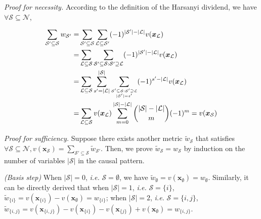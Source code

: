 \textit{Proof for necessity.}
According to the definition of the Harsanyi dividend, we have {\small$\forall \mathcal{S}\subseteq \mathcal{N}$}, 

\begin{small}
\begin{align*}
\sum_{\mathcal{S}'\subseteq \mathcal{S}}  w_{\mathcal{S}'}  =& \sum_{\mathcal{S}'\subseteq \mathcal{S}} \sum_{\mathcal{L}\subseteq \mathcal{S}'} (-1)^{|\mathcal{S}'|-|\mathcal{L}|}  v(\boldsymbol{x}_{\mathcal{L}}) \\
=& \sum_{\mathcal{L}\subseteq \mathcal{S}} \sum_{\mathcal{S}'\subseteq \mathcal{S}: \mathcal{S}'\supseteq \mathcal{L}} (-1)^{|\mathcal{S}'|-|\mathcal{L}|} v(\boldsymbol{x}_{\mathcal{L}}) \\
=& \sum_{\mathcal{L}\subseteq \mathcal{S}} \sum_{s'=|\mathcal{L}|}^{|\mathcal{S}|} \sum_{\scriptsize\substack{\mathcal{S}'\subseteq \mathcal{S}: \mathcal{S}'\supseteq \mathcal{L}\\
|\mathcal{S}'|=s'}} (-1)^{s'-|\mathcal{L}|} v(\boldsymbol{x}_{\mathcal{L}}) \\
=& \sum_{\mathcal{L}\subseteq \mathcal{S}} v(\boldsymbol{x}_{\mathcal{L}})  \sum_{m=0}^{|\mathcal{S}|-|\mathcal{L}|} \binom{|\mathcal{S}|-|\mathcal{L}|}{m} (-1)^{m}= v(\boldsymbol{x}_{\mathcal{S}}) 
\end{align*}
\end{small}



\textit{Proof for sufficiency.}
Suppose there exists another metric {\small$\tilde{w}_{\mathcal{S}}$} that satisfies {\small$\forall \mathcal{S}\subseteq \mathcal{N}, v(\boldsymbol{x}_{\mathcal{S}})  = {\sum}_{\mathcal{S}'\subseteq \mathcal{S}} \tilde{w}_{\mathcal{S}'} $}.
Then, we prove {\small$\tilde{w}_{\mathcal{S}} = w_{\mathcal{S}} $} by induction on the number of variables {\small$|\mathcal{S}|$} in the causal pattern.



\textit{(Basis step)}
When {\small$|\mathcal{S}|=0$}, \emph{i.e.} {\small$\mathcal{S}=\emptyset$}, we have {\small$\tilde{w}_{\emptyset} = v(\boldsymbol{x}_{\emptyset}) = w_{\emptyset}$}.
Similarly, it can be directly derived that when {\small$|\mathcal{S}|=1$}, \emph{i.e.} {\small$\mathcal{S}=\{i\}$}, {\small$\tilde{w}_{\{i\}} = v(\boldsymbol{x}_{\{i\}}) - v(\boldsymbol{x}_{\emptyset}) = w_{\{i\}}$}; 
when {\small$|\mathcal{S}|=2$}, \emph{i.e.} {\small$\mathcal{S}=\{i,j\}$}, {\small$\tilde{w}_{\{i,j\}} = v(\boldsymbol{x}_{\{i,j\}}) - v(\boldsymbol{x}_{\{i\}}) - v(\boldsymbol{x}_{\{j\}}) + v(\boldsymbol{x}_{\emptyset}) = w_{\{i, j\}}$}.


